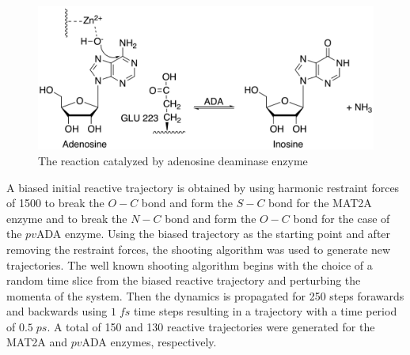 \documentclass[journal=jpcbfk,manuscript=article,layout=traditional]{achemso}
\begin{document}
\begin{figure}
\includegraphics[scale=0.6]{figures/ada-new.png}
\caption{The reaction catalyzed by adenosine deaminase enzyme}
\label{fig:ada-reaction}
\end{figure}

A biased initial reactive trajectory is obtained by using harmonic restraint forces 
of 1500 to break the $O-C$ bond and form the $S-C$ bond for the MAT2A enzyme and 
to break the $N-C$ bond and form the $O-C$ bond for the case of the $pv$ADA enzyme. 
Using the biased trajectory as the starting point and after removing the restraint 
forces, the shooting algorithm was used to generate
new trajectories. The well known shooting algorithm begins with the choice of a 
random time slice from the biased reactive trajectory and perturbing the momenta of the system.
Then the dynamics is propagated for 250 steps forawards and backwards using $1\;fs$ time steps
resulting in a trajectory with a time period of $0.5\;ps$.
A total of 150 and 130 reactive trajectories were generated for the MAT2A and $pv$ADA
enzymes, respectively. 
\end{document}
